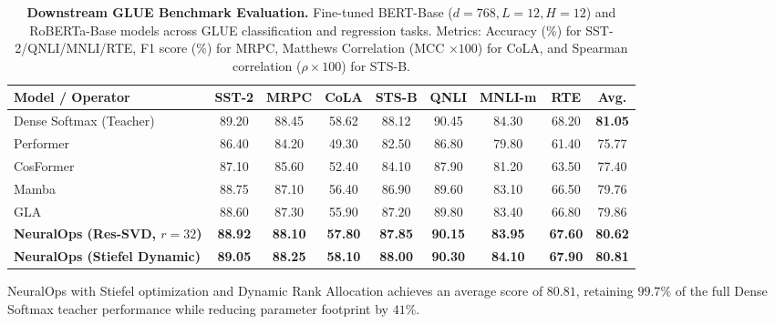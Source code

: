 \begin{table}[t]
\centering
\small
\caption{\textbf{Downstream GLUE Benchmark Evaluation.} Fine-tuned BERT-Base ($d=768, L=12, H=12$) and RoBERTa-Base models across GLUE classification and regression tasks. Metrics: Accuracy (\%) for SST-2/QNLI/MNLI/RTE, F1 score (\%) for MRPC, Matthews Correlation (MCC $\times 100$) for CoLA, and Spearman correlation ($\rho \times 100$) for STS-B.}
\label{tab:glue_results}
\begin{tabularx}{\textwidth}{lcccccccc}
\toprule
\textbf{Model / Operator} & \textbf{SST-2} & \textbf{MRPC} & \textbf{CoLA} & \textbf{STS-B} & \textbf{QNLI} & \textbf{MNLI-m} & \textbf{RTE} & \textbf{Avg.} \\
\midrule
Dense Softmax (Teacher) & 89.20 & 88.45 & 58.62 & 88.12 & 90.45 & 84.30 & 68.20 & \textbf{81.05} \\
\midrule
Performer~\cite{choromanski2020rethinking} & 86.40 & 84.20 & 49.30 & 82.50 & 86.80 & 79.80 & 61.40 & 75.77 \\
CosFormer~\cite{qin2022cosformer} & 87.10 & 85.60 & 52.40 & 84.10 & 87.90 & 81.20 & 63.50 & 77.40 \\
Mamba~\cite{gu2023mamba} & 88.75 & 87.10 & 56.40 & 86.90 & 89.60 & 83.10 & 66.50 & 79.76 \\
GLA~\cite{yang2023gated} & 88.60 & 87.30 & 55.90 & 87.20 & 89.80 & 83.40 & 66.80 & 79.86 \\
\midrule
\textbf{NeuralOps (Res-SVD, $r=32$)} & \textbf{88.92} & \textbf{88.10} & \textbf{57.80} & \textbf{87.85} & \textbf{90.15} & \textbf{83.95} & \textbf{67.60} & \textbf{80.62} \\
\textbf{NeuralOps (Stiefel Dynamic)} & \textbf{89.05} & \textbf{88.25} & \textbf{58.10} & \textbf{88.00} & \textbf{90.30} & \textbf{84.10} & \textbf{67.90} & \textbf{80.81} \\
\bottomrule
\end{tabularx}
\end{table}

NeuralOps with Stiefel optimization and Dynamic Rank Allocation achieves an average score of $80.81$, retaining $99.7\%$ of the full Dense Softmax teacher performance while reducing parameter footprint by $41\%$.


